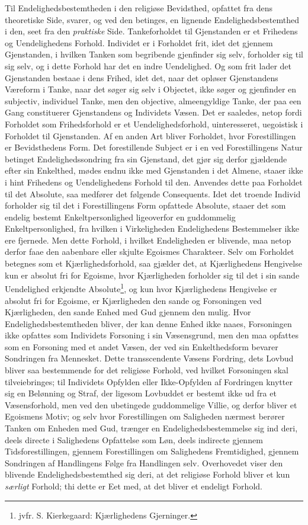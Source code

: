 \documentclass[12pt,a4paper]{book}
\newcommand{\opage}[1]{\marginnote{\footnotesize\textit{[#1]}}}
\begin{document}
\opage{36}Til Endelighedsbestemtheden i den religiøse Bevidsthed, opfattet fra dens
theoretiske Side, svarer, og ved den betinges, en lignende
Endelighedsbestemthed i den, seet fra den \emph{praktiske} Side. Tankeforholdet
til Gjenstanden er et Frihedens og Uendelighedens Forhold. Individet er i
Forholdet frit, idet det gjennem Gjenstanden, i hvilken Tanken som begribende
gjenfinder sig selv, forholder sig til sig selv, og i dette Forhold har det en
indre Uendelighed. Og som frit lader det Gjenstanden bestaae i dens Frihed, idet
det, naar det opløser Gjenstandens Væreform i Tanke, naar det søger sig selv i
Objectet, ikke søger og gjenfinder en subjectiv, individuel Tanke, men den
objective, almeengyldige Tanke, der paa een Gang constituerer Gjenstandens og
Individets Væsen. Det er saaledes, netop fordi Forholdet som Frihedsforhold er et
Uendelighedsforhold, uinteresseret, uegoistisk i Forholdet til Gjenstanden. Af en
anden Art bliver Forholdet, hvor Forestillingen er Bevidsthedens Form. Det
forestillende Subject er i en ved Forestillingens Natur betinget
Endelighedssondring fra sin Gjenstand, det gjør sig derfor gjældende efter sin
Enkelthed, mødes endnu ikke med Gjenstanden i det Almene, staaer ikke i hint
Frihedens og Uendelighedens Forhold til den. Anvendes dette paa Forholdet til
det Absolute, saa medfører det følgende Consequents. Idet det troende Individ
forholder sig til det i Forestillingens Form opfattede Absolute, staaer det som
endelig bestemt Enkeltpersonlighed ligeoverfor en guddommelig Enkeltpersonlighed,
fra hvilken i Virkeligheden Endelighedens Bestemmelser ikke ere fjernede. Men
dette Forhold, i hvilket Endeligheden er blivende, maa netop derfor faae den
aabenbare eller skjulte Egoismes Charakteer. Selv om Forholdet betegnes som et
Kjærlighedsforhold, saa gjælder det, at Kjærlighedens Hengivelse kun er absolut
fri for Egoisme, hvor Kjærligheden forholder sig til det i sin sande Uendelighed
erkjendte Absolute\footnote{jvfr. S. Kierkegaard: Kjærlighedens Gjerninger.}, og
kun hvor Kjærlighedens \opage{37}Hengivelse er absolut fri for Egoisme, er Kjærligheden den
sande og Forsoningen ved Kjærligheden, den sande Enhed med Gud gjennem den mulig.
Hvor Endelighedsbestemtheden bliver, der kan denne Enhed ikke naaes, Forsoningen
ikke opfattes som Individets Forsoning i sin Væsensgrund, men den maa opfattes som
en Forsoning med et andet Væsen, der ved sin Enkelthedsform bevarer Sondringen
fra Mennesket. Dette transscendente Væsens Fordring, dets Lovbud bliver saa
bestemmende for det religiøse Forhold, ved hvilket Forsoningen skal
tilveiebringes; til Individets Opfylden eller Ikke-Opfylden af Fordringen knytter
sig en Belønning og Straf, der ligesom Lovbuddet er bestemt ikke ud fra et
Væsensforhold, men ved den ubetingede guddommelige Villie, og derfor bliver et
Egoismens Motiv; og selv hvor Forestillingen om Saligheden nærmest berører Tanken
om Enheden med Gud, trænger en Endelighedsbestemmelse sig ind deri, deels directe
i Salighedens Opfattelse som Løn, deels indirecte gjennem Tidsforestillingen,
gjennem Forestillingen om Salighedens Fremtidighed, gjennem Sondringen af
Handlingens Følge fra Handlingen selv. Overhovedet viser den blivende
Endelighedsbestemthed sig deri, at det religiøse Forhold bliver et kun \emph{særligt} Forhold; thi dette er Eet med, at det bliver et endeligt Forhold.
\end{document}
